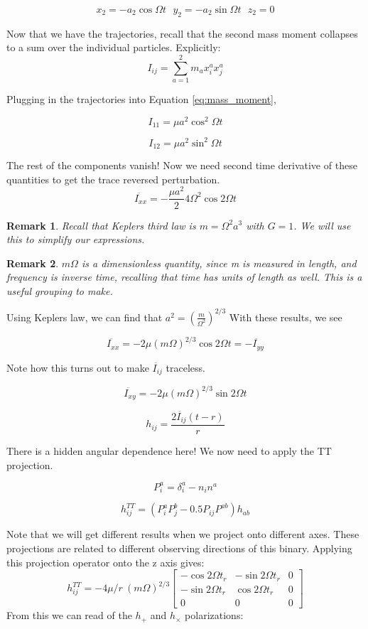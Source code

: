 \documentclass{article}
\newtheorem*{remark}{Remark}
\theoremstyle{definition}
\theoremstyle{remark}
\begin{document}
$$
x_2 = -a_2 \cos \Omega t \: \: \: y_2 = -a_2 \sin \Omega t \: \: \: z_2 = 0
$$

Now that we have the trajectories, recall that the second mass moment collapses to a sum over the individual particles. Explicitly:
\begin{equation}
I_{ij} = \sum_{a=1}^2 m_a x_i^a x_j^a
\end{equation}\label{eq:mass_moment}

Plugging in the trajectories into Equation \ref{eq:mass_moment},

$$
I_{11} = \mu a^2 \cos ^2 \Omega t
$$

$$
I_{12} = \mu a^2 \sin ^2 \Omega t
$$

The rest of the components vanish! Now we need second time derivative of these quantities to get the trace reversed perturbation.
$$
\ddot{I_{xx}} = - \frac{\mu a^2}{2} 4 \Omega^2 \cos 2 \Omega t 
$$

\begin{remark}
Recall that Keplers third law is $m = \Omega^2 a^3$ with $G = 1$. We will use this to simplify our expressions.
\end{remark}
\begin{remark}
$m \Omega$ is a dimensionless quantity, since m is measured in length, and frequency is inverse time, recalling that time has units of length as well. This is a useful grouping to make.
\end{remark}

Using Keplers law, we can find that $a^2 = (\frac{m}{\Omega ^2})^{2/3}$
With these results, we see 

$$
\ddot{I_{xx}} = - 2 \mu (m \Omega)^{2/3} \cos 2 \Omega t = - \ddot{I_{yy}} 
$$

Note how this turns out to make $\ddot{I_{ij}}$ traceless. 

$$
\ddot{I_{xy}} = - 2 \mu (m \Omega)^{2/3} \sin 2 \Omega t 
$$



$$
h_{ij} = \frac{2\ddot{I_{ij}}(t-r)}{r}
$$

There is a hidden angular dependence here! We now need to apply the TT projection.

$$
P_i^a = \delta_i^a - n_i n^a
$$

\begin{equation}
h_{ij}^{TT} = (P_i^a P_j^b - 0.5 P_{ij} P^{ab}) h_{ab}
\end{equation}\label{eq:tt_metric}

Note that we will get different results when we project onto different axes. These projections are related to different observing directions of this binary. Applying this projection operator onto the z axis gives:
$$
h_{ij}^{TT} = -4 \mu / r \: (m \Omega)^{2/3}
\begin{bmatrix}
- \cos 2 \Omega t_r & - \sin 2 \Omega t_r & 0\\
 - \sin 2 \Omega t_r &  \cos 2 \Omega t_r  & 0\\
 0 & 0 & 0
\end{bmatrix}
$$
From this we can read of the $h_+$ and $h_\times$ polarizations:
\end{document}
